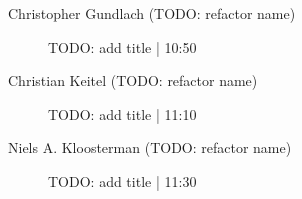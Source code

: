 \begin{symposium}
\begin{description}
                \item [Christopher Gundlach (TODO: refactor name)] TODO: add title \textcolor{mygray}{ | 10:50}    
                
                \item [Christian Keitel (TODO: refactor name)] TODO: add title \textcolor{mygray}{ | 11:10}    
                
                \item [Niels A. Kloosterman (TODO: refactor name)] TODO: add title \textcolor{mygray}{ | 11:30}    
                
            \end{description} 
            \end{symposium}
            